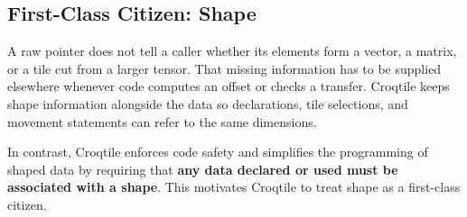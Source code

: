 \subsection*{First-Class Citizen: Shape}

A raw pointer does not tell a caller whether its elements form a vector, a matrix, or a tile cut from a larger tensor. That missing information has to be supplied elsewhere whenever code computes an offset or checks a transfer. Croqtile keeps shape information alongside the data so declarations, tile selections, and movement statements can refer to the same dimensions.

In contrast, Croqtile enforces code safety and simplifies the programming of shaped data by requiring that \textbf{any data declared or used must be associated with a shape}. This motivates Croqtile to treat shape as a first-class citizen.
